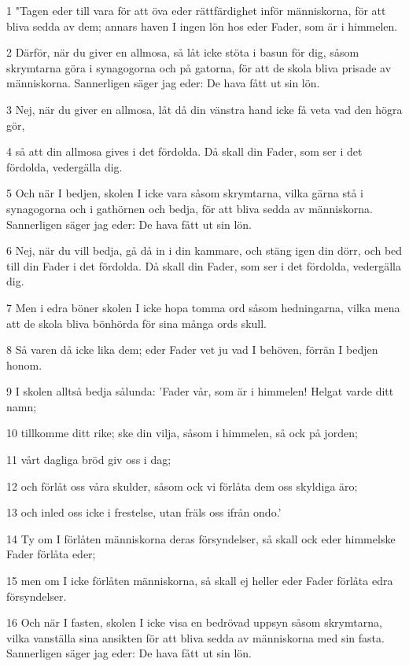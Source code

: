 \par 1 "Tagen eder till vara för att öva eder rättfärdighet inför människorna, för att bliva sedda av dem; annars haven I ingen lön hos eder Fader, som är i himmelen.
\par 2 Därför, när du giver en allmosa, så låt icke stöta i basun för dig, såsom skrymtarna göra i synagogorna och på gatorna, för att de skola bliva prisade av människorna. Sannerligen säger jag eder: De hava fått ut sin lön.
\par 3 Nej, när du giver en allmosa, låt då din vänstra hand icke få veta vad den högra gör,
\par 4 så att din allmosa gives i det fördolda. Då skall din Fader, som ser i det fördolda, vedergälla dig.
\par 5 Och när I bedjen, skolen I icke vara såsom skrymtarna, vilka gärna stå i synagogorna och i gathörnen och bedja, för att bliva sedda av människorna. Sannerligen säger jag eder: De hava fått ut sin lön.
\par 6 Nej, när du vill bedja, gå då in i din kammare, och stäng igen din dörr, och bed till din Fader i det fördolda. Då skall din Fader, som ser i det fördolda, vedergälla dig.
\par 7 Men i edra böner skolen I icke hopa tomma ord såsom hedningarna, vilka mena att de skola bliva bönhörda för sina många ords skull.
\par 8 Så varen då icke lika dem; eder Fader vet ju vad I behöven, förrän I bedjen honom.
\par 9 I skolen alltså bedja sålunda: 'Fader vår, som är i himmelen! Helgat varde ditt namn;
\par 10 tillkomme ditt rike; ske din vilja, såsom i himmelen, så ock på jorden;
\par 11 vårt dagliga bröd giv oss i dag;
\par 12 och förlåt oss våra skulder, såsom ock vi förlåta dem oss skyldiga äro;
\par 13 och inled oss icke i frestelse, utan fräls oss ifrån ondo.'
\par 14 Ty om I förlåten människorna deras försyndelser, så skall ock eder himmelske Fader förlåta eder;
\par 15 men om I icke förlåten människorna, så skall ej heller eder Fader förlåta edra försyndelser.
\par 16 Och när I fasten, skolen I icke visa en bedrövad uppsyn såsom skrymtarna, vilka vanställa sina ansikten för att bliva sedda av människorna med sin fasta. Sannerligen säger jag eder: De hava fått ut sin lön.
